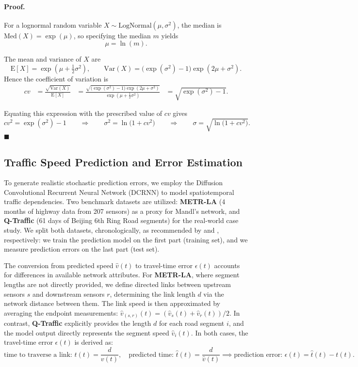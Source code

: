 \documentclass[a4paper,fleqn]{cas-sc}
\begin{document}
\paragraph{Proof.}
For a lognormal random variable $X \sim \mathrm{LogNormal}(\mu,\sigma^{2})$,  
the median is $\mathrm{Med}(X)=\exp(\mu)$, so specifying the median $m$ yields
\[
\mu = \ln(m).
\]

The mean and variance of $X$ are
\[
\mathrm{E}[X] = \exp\!\left(\mu + \tfrac{1}{2}\sigma^{2}\right),
\qquad
\mathrm{Var}(X) = \bigl(\exp(\sigma^{2}) - 1\bigr)\exp\!\left(2\mu + \sigma^{2}\right).
\]
Hence the coefficient of variation is
\[
\begin{aligned}
cv
&= \frac{\sqrt{\mathrm{Var}(X)}}{\mathrm{E}[X]}
&= \frac{\sqrt{\bigl(\exp(\sigma^{2}) - 1\bigr)\exp(2\mu + \sigma^{2})}}
        {\exp(\mu + \tfrac{1}{2}\sigma^{2})}
&= \sqrt{\exp(\sigma^{2}) - 1}.
\end{aligned}
\]

Equating this expression with the prescribed value of $cv$ gives
\[
cv^{2} = \exp(\sigma^{2}) - 1
\qquad\Longrightarrow\qquad
\sigma^{2} = \ln\!\bigl(1 + cv^{2}\bigr)
\qquad\Longrightarrow\qquad
\sigma = \sqrt{\ln\!\bigl(1 + cv^{2}\bigr)}.
\]
\hfill$\blacksquare$

\subsection{Traffic Speed Prediction and Error Estimation}\label{A2}

To generate realistic stochastic prediction errors, we employ the Diffusion Convolutional Recurrent Neural Network (DCRNN) \citep{li2017diffusion} to model spatiotemporal traffic dependencies. Two benchmark datasets are utilized: \textbf{METR-LA} (4 months of highway data from 207 sensors) as a proxy for Mandl’s network, and \textbf{Q-Traffic} (61 days of Beijing 6th Ring Road segments) for the real-world case study. We split both datasets, chronologically,  as recommended by \citet{li2017diffusion} and \citet{lu2022graph}, respectively: we train the prediction model on the first part (training set), and we measure prediction errors on the last part (test set).

The conversion from predicted speed $\hat{v}(t)$ to travel-time error $\epsilon(t)$ accounts for differences in available network attributes. For \textbf{METR-LA}, where segment lengths are not directly provided, we define directed links between upstream sensors $s$ and downstream sensors $r$, determining the link length $d$ via the network distance between them. The link speed is then approximated by averaging the endpoint measurements: $\hat{v}_{(s,r)}(t) = (\hat{v}_s(t) + \hat{v}_r(t))/2$. In contrast, \textbf{Q-Traffic} explicitly provides the length $d$ for each road segment $i$, and the model output directly represents the segment speed $\hat{v}_i(t)$. In both cases, the travel-time error $\epsilon(t)$ is derived as:
\[
    \text{time to traverse a link: }t(t) = \frac{d}{v(t)}, \quad \text{predicted time: }\hat{t}(t) = \frac{d}{\hat{v}(t)} \implies \text{prediction error: } \epsilon(t) = \hat{t}(t) - t(t).
\]
\end{document}
